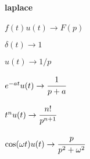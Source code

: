 \documentclass[10pt,twocolumn,a4paper]{article}
\begin{document}
%
%
%
%
%
%
%
%
%
%
%

\paragraph{laplace}
$f(t)u(t) \rightarrow F(p)$

$\delta (t) \rightarrow 1 $

$u(t) \rightarrow 1/p$

$e^{-at}u(t) \rightarrow \cfrac{1}{p+a}$

$t^nu(t) \rightarrow \cfrac{n!}{p^{n+1}}$

$\cos(\omega t) u(t) \rightarrow \cfrac{p}{p^2 + \omega^2}$
\end{document}
